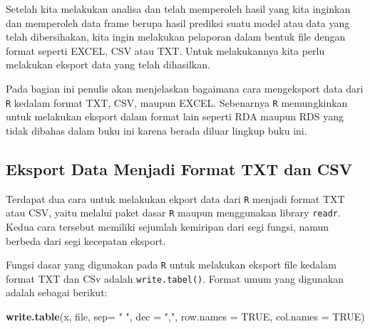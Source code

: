 \documentclass[]{book}
\newenvironment{Shaded}{\begin{snugshade}}{\end{snugshade}}
\newcommand{\KeywordTok}[1]{\textcolor[rgb]{0.13,0.29,0.53}{\textbf{#1}}}
\newcommand{\DataTypeTok}[1]{\textcolor[rgb]{0.13,0.29,0.53}{#1}}
\newcommand{\StringTok}[1]{\textcolor[rgb]{0.31,0.60,0.02}{#1}}
\newcommand{\OtherTok}[1]{\textcolor[rgb]{0.56,0.35,0.01}{#1}}
\newcommand{\NormalTok}[1]{#1}
\begin{document}
Setelah kita melakukan analisa dan telah memperoleh hasil yang kita
inginkan dan memperoleh data frame berupa hasil prediksi suatu model
atau data yang telah dibersihakan, kita ingin melakukan pelaporan dalam
bentuk file dengan format seperti EXCEL, CSV atau TXT. Untuk
melakukannya kita perlu melakukan eksport data yang telah dihasilkan.

Pada bagian ini penulis akan menjelaskan bagaimana cara mengeksport data
dari \texttt{R} kedalam format TXT, CSV, maupun EXCEL. Sebenarnya
\texttt{R} memungkinkan untuk melakukan eksport dalam format lain
seperti RDA maupun RDS yang tidak dibahas dalam buku ini karena berada
diluar lingkup buku ini.

\subsection{Eksport Data Menjadi Format TXT dan
CSV}\label{eksport-data-menjadi-format-txt-dan-csv}

Terdapat dua cara untuk melakukan ekport data dari \texttt{R} menjadi
format TXT atau CSV, yaitu melalui paket dasar \texttt{R} maupun
menggunakan library \texttt{readr}. Kedua cara tersebut memiliki
sejumlah kemiripan dari segi fungsi, namun berbeda dari segi kecepatan
eksport.

Fungsi dasar yang digunakan pada \texttt{R} untuk melakukan eksport file
kedalam format TXT dan CSv adalah \texttt{write.tabel()}. Format umum
yang digunakan adalah sebagai berikut:

\begin{Shaded}
\begin{Highlighting}[]
\KeywordTok{write.table}\NormalTok{(x, file, }\DataTypeTok{sep=} \StringTok{" "}\NormalTok{, }\DataTypeTok{dec =} \StringTok{","}\NormalTok{,}
            \DataTypeTok{row.names =} \OtherTok{TRUE}\NormalTok{, }\DataTypeTok{col.names =} \OtherTok{TRUE}\NormalTok{)}
\end{Highlighting}
\end{Shaded}
\end{document}
